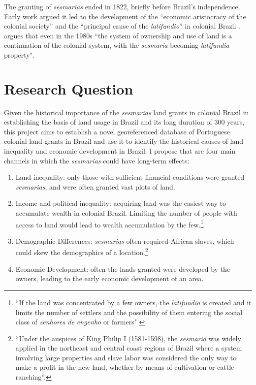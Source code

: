 \documentclass{article}
\begin{document}
The granting of \textit{sesmarias} ended in 1822, briefly before Brazil's independence.
Early work argued it led to the development of the ``economic aristocracy of the colonial society'' and the ``principal cause of the \textit{latifundio}'' in colonial Brazil \parencites[p.~36]{Lima2002-kd}[p.~48]{Da_Costa_Porto1979-dz}. 
\textcite[p.~18]{Andrade1980-md} argues that even in the 1980s ``the system of ownership and use of land is a continuation of the colonial system, with the \textit{sesmaria} becoming \textit{latifundia} property".

\section{Research Question}

Given the historical importance of the \textit{sesmarias} land grants in colonial Brazil in establishing the basis of land usage in Brazil and its long duration of 300 years, this project aims to establish a novel georeferenced database of Portuguese colonial land grants in Brazil and use it to identify the historical causes of land inequality and economic development in Brazil. I propose that are four main channels in which the \textit{sesmarias} could have long-term effects:

\begin{enumerate}
  \item Land inequality: only those with sufficient financial conditions were granted \textit{sesmarias}, and were often granted vast plots of land.
  \item Income and political inequality: acquiring land was the easiest way to accumulate wealth in colonial Brazil. Limiting the number of people with access to land would lead to wealth accumulation by the few.\footnote{``If the land was concentrated by a few owners, the \textit{latifundio} is created and it limits the number of settlers and the possibility of them entering the social class of \textit{senhores de engenho} or farmers" \parencite[p.~40]{Bandecchi1963-uj}}
  \item Demographic Differences: \textit{sesmarias} often required African slaves, which could skew the demographics of a location.\footnote{``Under the auspices of King Philip I (1581-1598), the \textit{sesmaria} was widely applied in the northeast and central coast regions of Brazil where a system involving large properties and slave labor was considered the only way to make a profit in the new land, whether by means of cultivation or cattle ranching''\parencite{Lobb1976-mc}.}
  \item Economic Development: often the lands granted were developed by the owners, leading to the early economic development of an area.
\end{enumerate}
\end{document}
